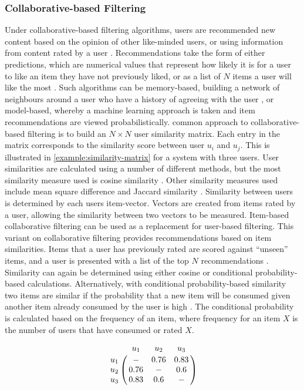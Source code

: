 \subsubsection{Collaborative-based Filtering} 
Under collaborative-based filtering algorithms, users are recommended new content based on the opinion of other like-minded users, or using information from content rated by a user \cite{sarwar2001item}. Recommendations take the form of either predictions, which are numerical values that represent how likely it is for a user to like an item they have not previously liked, or as a list of $N$ items a user will like the most \cite{sarwar2001item}. Such algorithms can be memory-based, building a network of neighbours around a user who have a history of agreeing with the user \cite{sarwar2001item}, or model-based, whereby a machine learning approach is taken and item recommendations are viewed probabilistically.  common approach to collaborative-based filtering is to build an $N \times N$ user similarity matrix. Each entry in the matrix corresponds to the similarity score between user $u_i$ and $u_j$. This is illustrated in \ref{example:similarity-matrix} for a system with three users. User similarities are calculated using a number of different methods, but the most similarity measure used is cosine similarity \cite{linden2003amazon} \cite{sarwar2001item} \cite{liu2014new}. Other similarity measures used include mean square difference and Jaccard similarity \cite{liu2014new}. Similarity between users is determined by each users item-vector.
Vectors are created from items rated by a user, allowing the similarity between two vectors to be measured. Item-based collaborative filtering can be used as a replacement for user-based filtering. This variant on collaborative filtering provides recommendations based on item similarities. Items that a user has previously rated are scored against ``unseen'' items, and a user is presented with a list of the top $N$ recommendations \cite{sarwar2001item}. Similarity can  again be determined using either cosine or conditional probability-based calculations. Alternatively, with conditional probability-based similarity two items are similar if the probability that a new item will be consumed given another item already consumed by the user is high \cite{sarwar2001item}. The conditional probability is calculated based on the frequency of an item, where frequency for an item $X$ is the number of users that have consumed or rated $X$. 

\begin{equation}
\bordermatrix{~ & u_1 & u_2 & u_3 \cr
            u_1 & - & 0.76 & 0.83 \cr
            u_2 & 0.76 & - & 0.6\cr
            u_3 & 0.83 & 0.6 & - \cr}
\label{example:similarity-matrix}
\end{equation}

